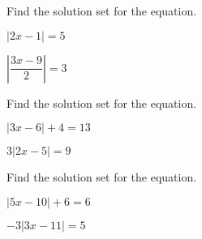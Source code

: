 \newpage
\begin{exercise}
	Find the solution set for the equation. %


	\noindent
	\begin{enumerate*}[label=\textup{(\arabic*)~}]
		\item  $|2x-1|=5$
		\item  $\left|\dfrac{3x-9}{2}\right|=3$ \hfill\null
	\end{enumerate*}
\end{exercise}

\vfill
\begin{center}\hfill
\end{center}


\begin{exercise}
	Find the solution set for the equation. %

	\noindent
	\begin{enumerate*}[label=\textup{(\arabic*)~}]
		\item  $|3x-6|+4=13$
		\item  $3|2x-5|=9$ \hfill\null
	\end{enumerate*}
\end{exercise}

\vfill
\begin{center}\hfill
\end{center}

\begin{exercise}
	Find the solution set for the equation. %

	\noindent
	\begin{enumerate*}[label=\textup{(\arabic*)~}]
		\item  $|5x-10|+6=6$
		\item  $-3|3x-11|=5$ \hfill\null
	\end{enumerate*}
\end{exercise}

